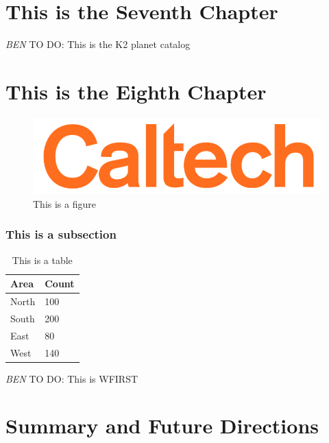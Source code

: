 \documentclass[12pt]{caltech_thesis}
\newcommand{\todo}[3]{{\color{#2} \emph{#1} TO DO: #3}}
\newcommand{\btmtodo}[1]{\todo{BEN}{red}{#1}}
\begin{document}
\chapter{This is the Seventh Chapter}
\label{chap:k2}

\btmtodo{This is the K2 planet catalog}

\chapter{This is the Eighth Chapter}
\label{chap:wfirst}

\begin{figure}[hbt!]
\centering
\includegraphics[width=.3\textwidth]{caltech.png}
\caption[Example Figure]{This is a figure}
\label{fig:logo}
\end{figure}

\subsection{This is a subsection}

\begin{table}[hbt!]
\centering
\begin{tabular}{ll}
\hline
Area & Count\\
\hline
North & 100\\
South & 200\\
East & 80\\
West & 140\\
\hline
\end{tabular}
\caption[Table]{This is a table}
\label{tab:sample}
\end{table}

\btmtodo{This is WFIRST}

\chapter{Summary and Future Directions}
\label{chap:summary}





\printbibliography[heading=bibintoc]
%





\end{document}
